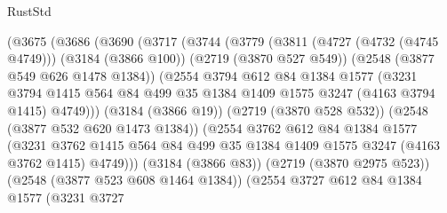 \begin{lexlean}{RustStd}
\begin{coremodule}
                  (@3675
                    (@3686
                      (@3690
                        (@3717
                          (@3744
                            (@3779
                              (@3811
                                (@4727 (@4732 (@4745 @4749)))
                                (@3184 (@3866 @100))
                                (@2719 (@3870 @527 @549))
                                (@2548 (@3877 @549 @626 @1478 @1384))
                                (@2554
                                  @3794
                                  @612
                                  @84
                                  @1384
                                  @1577
                                  (@3231
                                    @3794
                                    @1415
                                    @564
                                    @84
                                    @499
                                    @35
                                    @1384
                                    @1409
                                    @1575
                                    @3247
                                    (@4163 @3794 @1415)
                                    @4749)))
                              (@3184 (@3866 @19))
                              (@2719 (@3870 @528 @532))
                              (@2548 (@3877 @532 @620 @1473 @1384))
                              (@2554
                                @3762
                                @612
                                @84
                                @1384
                                @1577
                                (@3231
                                  @3762
                                  @1415
                                  @564
                                  @84
                                  @499
                                  @35
                                  @1384
                                  @1409
                                  @1575
                                  @3247
                                  (@4163 @3762 @1415)
                                  @4749)))
                            (@3184 (@3866 @83))
                            (@2719 (@3870 @2975 @523))
                            (@2548 (@3877 @523 @608 @1464 @1384))
                            (@2554
                              @3727
                              @612
                              @84
                              @1384
                              @1577
                              (@3231
                                @3727

\end{coremodule}
\end{lexlean}
